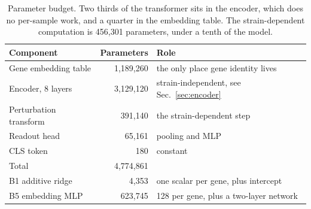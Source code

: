 \begin{table}[htbp]
\centering
\begin{tabular}{lrl}
\hline
Component & Parameters & Role \\
\hline
Gene embedding table & 1{,}189{,}260 & the only place gene identity lives \\
Encoder, 8 layers & 3{,}129{,}120 & strain-independent, see Sec.~\ref{sec:encoder} \\
Perturbation transform & 391{,}140 & the strain-dependent step \\
Readout head & 65{,}161 & pooling and MLP \\
CLS token & 180 & constant \\
\hline
Total & 4{,}774{,}861 & \\
\hline
B1 additive ridge & 4{,}353 & one scalar per gene, plus intercept \\
B5 embedding MLP & 623{,}745 & 128 per gene, plus a two-layer network \\
\hline
\end{tabular}
\caption{Parameter budget. Two thirds of the transformer sits in the encoder,
which does no per-sample work, and a quarter in the embedding table. The
strain-dependent computation is 456{,}301 parameters, under a tenth of the
model.}
\label{tab:params}
\end{table}
